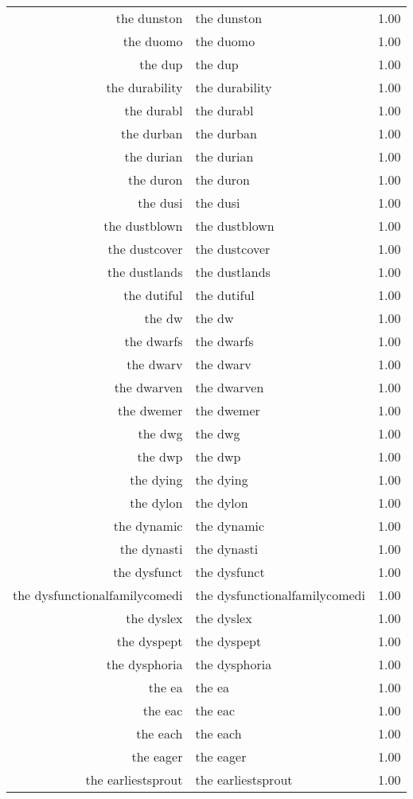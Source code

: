 \begin{table}[ht]
\begin{tabular}{rlr}
  the dunston & the dunston & 1.00 \\ 
  the duomo & the duomo & 1.00 \\ 
  the dup & the dup & 1.00 \\ 
  the durability & the durability & 1.00 \\ 
  the durabl & the durabl & 1.00 \\ 
  the durban & the durban & 1.00 \\ 
  the durian & the durian & 1.00 \\ 
  the duron & the duron & 1.00 \\ 
  the dusi & the dusi & 1.00 \\ 
  the dustblown & the dustblown & 1.00 \\ 
  the dustcover & the dustcover & 1.00 \\ 
  the dustlands & the dustlands & 1.00 \\ 
  the dutiful & the dutiful & 1.00 \\ 
  the dw & the dw & 1.00 \\ 
  the dwarfs & the dwarfs & 1.00 \\ 
  the dwarv & the dwarv & 1.00 \\ 
  the dwarven & the dwarven & 1.00 \\ 
  the dwemer & the dwemer & 1.00 \\ 
  the dwg & the dwg & 1.00 \\ 
  the dwp & the dwp & 1.00 \\ 
  the dying & the dying & 1.00 \\ 
  the dylon & the dylon & 1.00 \\ 
  the dynamic & the dynamic & 1.00 \\ 
  the dynasti & the dynasti & 1.00 \\ 
  the dysfunct & the dysfunct & 1.00 \\ 
  the dysfunctionalfamilycomedi & the dysfunctionalfamilycomedi & 1.00 \\ 
  the dyslex & the dyslex & 1.00 \\ 
  the dyspept & the dyspept & 1.00 \\ 
  the dysphoria & the dysphoria & 1.00 \\ 
  the ea & the ea & 1.00 \\ 
  the eac & the eac & 1.00 \\ 
  the each & the each & 1.00 \\ 
  the eager & the eager & 1.00 \\ 
  the earliestsprout & the earliestsprout & 1.00 \\ 

\end{tabular}
\end{table}
